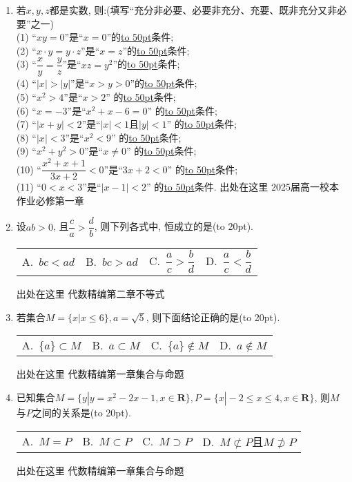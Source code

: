 \documentclass[10pt,a4paper]{article}
\newcommand{\blank}[1]{\underline{\hbox to #1pt{}}}
\newcommand{\bracket}[1]{(\hbox to #1pt{})}
\newcommand{\fourch}[4]{\par\begin{tabular}{p{.23\textwidth}p{.23\textwidth}p{.23\textwidth}p{.23\textwidth}}
A.~#1 &B.~#2& C.~#3& D.~#4
\end{tabular}}
\begin{document}
\begin{enumerate}[1.]

\item 若$x,y,z$都是实数, 则:(填写``充分非必要、必要非充分、充要、既非充分又非必要''之一)\\
(1) ``$xy=0$''是``$x=0$''的\blank{50}条件;\\
(2) ``$x\cdot y=y\cdot z$''是``$x=z$''的\blank{50}条件;\\
(3) ``$\dfrac xy=\dfrac yz$''是``$xz=y^2$''的\blank{50}条件;\\
(4) ``$|x |>| y|$''是``$x>y>0$''的\blank{50}条件;\\
(5) ``$x^2>4$''是``$x>2$'' 的\blank{50}条件;\\
(6) ``$x=-3$''是``$x^2+x-6=0$'' 的\blank{50}条件;\\
(7) ``$|x+y|<2$''是``$|x|<1$且$|y|<1$'' 的\blank{50}条件;\\
(8) ``$|x|<3$''是``$x^2<9$'' 的\blank{50}条件;\\
(9) ``$x^2+y^2>0$''是``$x\ne 0$'' 的\blank{50}条件;\\
(10) ``$\dfrac{x^2+x+1}{3x+2}<0$''是``$3x+2<0$'' 的\blank{50}条件;\\
(11) ``$0<x<3$''是``$|x-1|<2$'' 的\blank{50}条件.
出处在这里 2025届高一校本作业必修第一章


\item 设$ab>0$, 且$\dfrac ca>\dfrac db$, 则下列各式中, 恒成立的是\bracket{20}.
\fourch{$bc<ad$}{$bc>ad$}{$\dfrac ac>\dfrac bd$}{$\dfrac ac<\dfrac bd$}
出处在这里 代数精编第二章不等式

\item 若集合$M=\{x |x\le 6\},a=\sqrt 5$, 则下面结论正确的是\bracket{20}.
\fourch{$\{ a\}\subset M$}{$a\subset M$}{$\{ a\}\notin M$}{$a\notin M$}
出处在这里 代数精编第一章集合与命题

\item 已知集合$M=\{y |y=x^2-2x-1,x\in \mathbf{R}\},P=\{x |-2\le x\le 4,x\in \mathbf{R}\}$, 则$M$与$P$之间的关系是\bracket{20}.
\fourch{$M=P$}{$M\subset P$}{$M\supset P$}{$M\not\subset P$且$M\not\supset P$}
出处在这里 代数精编第一章集合与命题

\end{enumerate}
\end{document}
